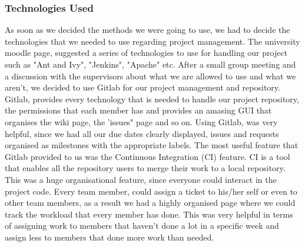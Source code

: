 \documentclass{l3proj}
\begin{document}
\subsubsection{Technologies Used}
\label{tech}

As soon as we decided the methods we were going to use, we had to decide the technologies that we needed to use regarding project management. The university moodle page, suggested a series of technologies to use for handling our project such as "Ant and Ivy", "Jenkins", "Apache" etc. After a small group meeting and a discussion with the supervisors about what we are allowed to use and what we aren't, we decided to use Gitlab for our project management and repository. Gitlab, provides every technology that is needed to handle our project repository, the permissions that each member has and provides an amasing GUI that organises the wiki page, the 'issues" page and so on. Using Gitlab, was very helpful, since we had all our due dates clearly displayed, issues and requests organised as milestones with the appropriate labels. The most useful feature that Gitlab provided to us was the Continuous Integration (CI) feature. CI is a tool that enables all the repository users to merge their work to a local repository. This was a huge organisational feature, since everyone could interact in the project code. Every team member, could assign a ticket to his/her self or even to other team members, as a result we had a highly organised page where we could track the workload that every member has done. This was very helpful in terms of assigning work to members that haven't done a lot in a specific week and assign less to members that done more work than needed.
\end{document}
